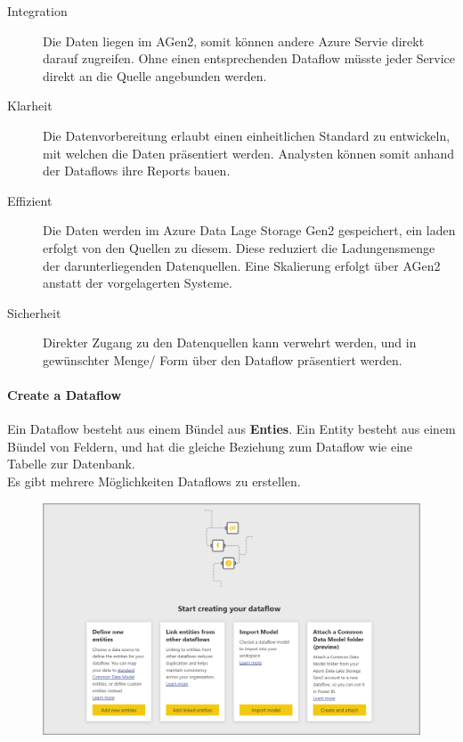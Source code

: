 \begin{description}
	\item[Integration] Die Daten liegen im \gls{AGen2}, somit können andere Azure Servie direkt darauf zugreifen. Ohne einen entsprechenden Dataflow müsste jeder Service direkt an die Quelle angebunden werden.
	\item[Klarheit] Die Datenvorbereitung erlaubt einen einheitlichen Standard zu entwickeln, mit welchen die Daten präsentiert werden. Analysten können somit anhand der Dataflows ihre Reports bauen.
	\item[Effizient] Die Daten werden im Azure Data Lage Storage Gen2 gespeichert, ein laden erfolgt von den Quellen zu diesem. Diese reduziert die Ladungensmenge der darunterliegenden Datenquellen. Eine Skalierung erfolgt über \gls{AGen2} anstatt der vorgelagerten Systeme.
	\item[Sicherheit] Direkter Zugang zu den Datenquellen kann verwehrt werden, und in gewünschter Menge/ Form über den Dataflow präsentiert werden. 
\end{description}

\paragraph{Create a Dataflow}
Ein Dataflow besteht aus einem Bündel aus \textbf{Enties}. Ein Entity besteht aus einem Bündel von Feldern, und hat die gleiche Beziehung zum Dataflow wie eine Tabelle zur Datenbank.\\

Es gibt mehrere Möglichkeiten Dataflows zu erstellen.
\begin{figure}[H]
	\centering
	\includegraphics[scale = 0.3]{attachment/chapter_1/Scc138}
\end{figure}

